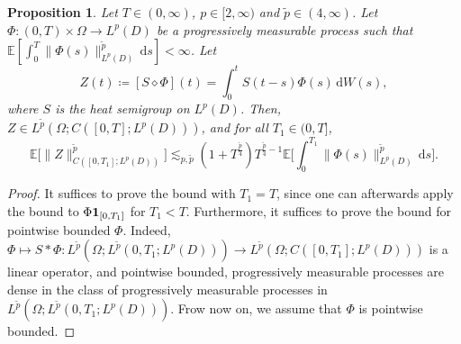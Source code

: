 \documentclass[10pt,a4paper]{amsart}
\newtheorem{proposition}[theorem]{Proposition}
\numberwithin{equation}{section}
\newcommand{\ceqq}{\coloneqq}
\newcommand{\col}{\colon}
\newcommand{\E}{{\mathbb E}}
\newcommand{\Om}{\Omega}
\newcommand{\dd}{\,\mathrm{d}}
\newcommand{\one}{{{\bf 1}}}
\begin{document}
\begin{proposition}\label{prop:stoch conv}  
Let $T\in(0,\infty)$, $p\in[2,\infty)$ and $\tilde p\in(4,\infty)$. Let $\Phi\col (0,T)\times \Om\to L^p(D)$ be a progressively measurable process such that 
$\E[\int_0^{T}\|\Phi(s)\|_{L^p(D)}^{\tilde p}\dd s]<\infty$. 
Let $$Z(t)\ceqq [S\diamond\Phi](t)= \textstyle{\int_0^t} S(t-s)\Phi(s)\dd W(s),$$ 
where $S$ is the heat semigroup on $L^p(D)$. 
Then, $Z\in L^{\tilde p}(\Om;C([0,T];L^p(D)))$,  and for all $T_1\in(0,T]$,  
\[
\E\big[\|Z\|_{C([0,T_1];L^{p}(D))}^{{\tilde p}}\big]\lesssim_{p,\tilde p}(1+T^{\frac{\tilde p}{4}})T^{\frac{\tilde p}{4}-1}\E\Big[\int_0^{T_1}\|\Phi(s)\|_{L^p(D)}^{\tilde p}\dd s\Big]. 
\] 
\end{proposition}
\begin{proof} 
It suffices to prove the bound with $T_1=T$, since one can afterwards apply the bound to $\Phi\one_{[0,T_1]}$ for $T_1<T$.  
Furthermore, it suffices to prove the bound for pointwise bounded $\Phi$.  Indeed, $\Phi\mapsto S*\Phi\col L^{\tilde p}(\Om ;L^{\tilde p}(0,T_1;L^p(D)))\to L^{\tilde p}(\Om;C([0,T_1];L^{p}(D)))$ is a linear operator, and pointwise bounded, progressively measurable processes are dense in the class of progressively measurable processes in  $L^{\tilde p}(\Om ;L^{\tilde p}(0,T_1;L^p(D)))$. Frow now on, we assume that $\Phi$ is pointwise bounded. 


\end{proof}
\end{document}
